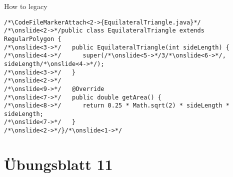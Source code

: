 \begin{frame}[c, fragile]{How to legacy}
\begin{verbatim}
/*\CodeFileMarkerAttach<2->{EquilateralTriangle.java}*/
/*\onslide<2->*/public class EquilateralTriangle extends RegularPolygon {
/*\onslide<3->*/   public EquilateralTriangle(int sideLength) {
/*\onslide<4->*/      super(/*\onslide<5->*/3/*\onslide<6->*/, sideLength/*\onslide<4->*/);
/*\onslide<3->*/   }
/*\onslide<2->*/
/*\onslide<9->*/   @Override
/*\onslide<7->*/   public double getArea() {
/*\onslide<8->*/      return 0.25 * Math.sqrt(2) * sideLength * sideLength;
/*\onslide<7->*/   }
/*\onslide<2->*/}/*\onslide<1->*/
\end{verbatim}
\end{frame}

\section{Übungsblatt 11}
